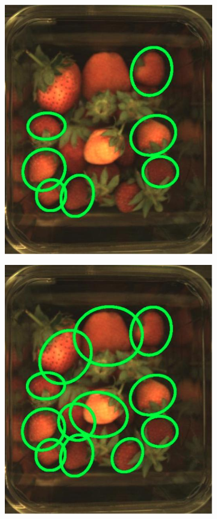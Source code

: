\documentclass[fleqn,twoside,12pt]{report}
\begin{document}
\begin{figure}[h]
	\begin{subfigure}{.33\textwidth}
		\centering
		\includegraphics[width=.9\linewidth]{small_a_7.jpg}
		\caption{}
		\label{fig:small_a_7}
	\end{subfigure}%
	\begin{subfigure}{.33\textwidth}
		\centering
		\includegraphics[width=.9\linewidth]{small_b_7.jpg}
		\caption{}
		\label{fig:small_b_7}
	\end{subfigure}%
	

\end{figure}
\end{document}
